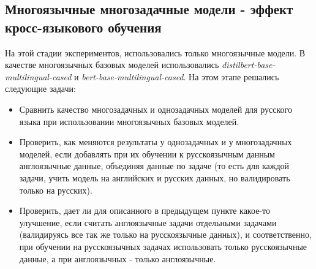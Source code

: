 \subsection{Многоязычные многозадачные модели - эффект кросс-языкового обучения}

На этой стадии экспериментов, использовались только многоязычные модели. В качестве многоязычных базовых моделей использовались \textit{distilbert-base-multilingual-cased} и \textit{bert-base-multilingual-cased}. На этом этапе решались следующие задачи:

 \begin{itemize}
\item Сравнить качество многозадачных и однозадачных моделей для русского языка при использовании многоязычных базовых моделей. 
\item Проверить, как меняются результаты у однозадачных и у многозадачных моделей, если добавлять при их обучении к русскоязычным данным англоязычные данные, объединяя данные по задаче (то есть для каждой задачи, учить модель на английских и русских данных, но валидировать только на русских).
\item Проверить, дает ли для описанного в предыдущем пункте какое-то улучшение, если считать англоязычные задачи отдельными задачами (валидируясь все так же только на русскоязычные данных), и соответственно, при обучении на русскоязычных задачах использовать только русскоязычные данные, а при англоязычных - только англоязычные. 
\end{itemize} 

